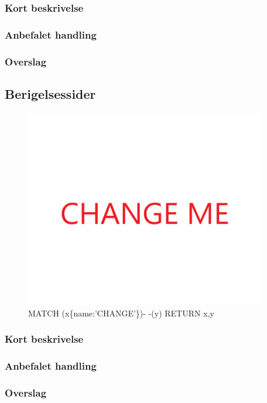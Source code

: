 \documentclass{article}
\begin{document}
\subsubsection{Kort beskrivelse}
\subsubsection{Anbefalet handling}
\subsubsection{Overslag}


\subsection{Berigelsessider}
\begin{figure}[h]
\includegraphics[width=300pt]{CHANGE.PNG}
\caption{MATCH (x\{name:'CHANGE'\})- -(y) RETURN x,y}
\end{figure}
\subsubsection{Kort beskrivelse}
\subsubsection{Anbefalet handling}
\subsubsection{Overslag}
\end{document}
